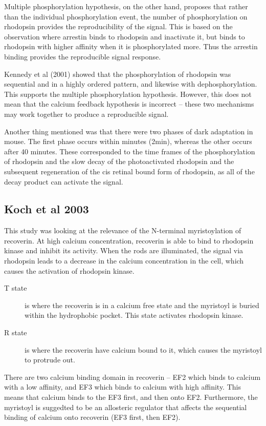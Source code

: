 \documentclass[a4paper,12pt]{article}
\begin{document}
Multiple phosphorylation hypothesis, on the other hand, proposes that rather than the individual phosphorylation event, the number of phosphorylation on rhodopsin provides the reproducibility of the signal.
This is based on the observation where arrestin binds to rhodopsin and inactivate it, but binds to rhodopsin with higher affinity when it is phosphorylated more.
Thus the arrestin binding provides the reproducible signal response.

Kennedy et al (2001) showed that the phosphorylation of  rhodopsin was sequential and in a highly ordered pattern, and likewise with dephosphorylation.
This supports the multiple phosphorylation hypothesis.
However, this does not mean that the calcium feedback hypothesis is incorrect -- these two mechanisms may work together to produce a reproducible signal.

Another thing mentioned was that there were two phases of dark adaptation in mouse.
The first phase occurs within minutes (2min), whereas the other occurs after 40 minutes.
These corresponded to the time frames of the phosphorylation of rhodopsin and the slow decay of the photoactivated rhodopsin and the subsequent regeneration of the cis retinal bound form of rhodopsin, as all of the decay product can activate the signal.

\subsection*{Koch et al 2003}

This study was looking at the relevance of the N-terminal myristoylation of recoverin.
At high calcium concentration, recoverin is able to bind to rhodopsin kinase and inhibit its activity.
When the rods are illuminated, the signal via rhodopsin leads to a decrease in the calcium concentration in the cell, which causes the activation of rhodopsin kinase.

\begin{description}
\item[T state]is where the recoverin is in a calcium free state and the myristoyl is buried within the hydrophobic pocket.
This state activates rhodopsin kinase.
\item[R state]is where the recoverin have calcium bound to it, which causes the myristoyl to protrude out.
\end{description}

There are two calcium binding domain in recoverin -- EF2 which binds to calcium with a low affinity, and EF3 which binds to calcium with high affinity.
This means that calcium binds to the EF3 first, and then onto EF2.
Furthermore, the myristoyl is suggedted to be an allosteric regulator that affects the sequential binding of calcium onto recoverin (EF3 first, then EF2).
\end{document}
